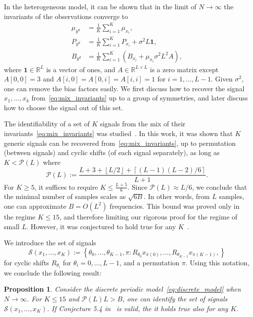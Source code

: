 \documentclass[english,12pt]{article}
\newcommand{\TODO}[1]{{\color{red}{[#1]}}}
\numberwithin{equation}{section}
\numberwithin{thm}{section} %
\newtheorem{prop}[thm]{Proposition}
\begin{document}
In the heterogeneous model, it can be shown that in the limit of $N\to\infty$ the invariants of the observations converge to \TODO{should be written more accurately} 
\begin{align} \label{eq:mix_invariants}
\mu_{y^d} &= \frac{1}{K}\sum_{i=1}^K \mu_{x_i}, \nonumber\\
P_{y^d} &= \frac{1}{K}\sum_{i=1}^K P_{x_i} + \sigma^2L\mathbf{1}, \\
B_{y^d} &= \frac{1}{K}\sum_{i=1}^K (B_{x_i} +\mu_{x_i}\sigma^2L^2 A ), \nonumber
\end{align}
where $\mathbf{1}\in\mathbb{R}^L$ is a vector of ones, and $A\in\mathbb{R}^{L\times L}$ is a zero matrix except $A[0,0]=3$ and $A[i,0]=A[0,i]=A[i,i]=1$ for $i=1,\ldots,L-1$.
Given $\sigma^2$, one can remove the bias factors easily. 
We first discuss how to recover the signal $x_1,\ldots,x_k$ from~\eqref{eq:mix_invariants} up to a group of symmetries, and later discuss how to  choose the signal out of this set. 

The identifiability of a set of $K$ signals from the mix of their  invariants~\eqref{eq:mix_invariants} was studied~\cite{bandeira2017estimation}. In this work, it was shown that $K$ generic signals can be recovered from~\eqref{eq:mix_invariants}, up to permutation (between signals) and cyclic shifts (of each signal separately), as long as $K<\mathcal{P}(L)$ where
\begin{equation} \label{eq:Pl}
\mathcal{P}(L) := \frac{L+3+\left\lfloor L/2\right\rfloor +  \left\lceil (L-1)(L-2)/6\right\rceil}{L+1}.
\end{equation}
For $K\geq 5$, it suffices to require $K\leq \frac{L+5}{6}$. 
Since $\mathcal{P}(L) \approx L/6$, we conclude that the minimal number of samples scales as $\sqrt{6B}$. In other words, from $L$ samples, one can approximate  $B=O(L^2)$ frequencies. 
This bound was proved only in the regime $K\leq 15$, and therefore limiting our rigorous proof for the regime of small $L$. 
However, it was conjectured  to hold true for any $K$~\cite[Conjecture 5.4]{bandeira2017estimation}. \TODO{To stress the difference between identify the signals, and recover them.}

We introduce the set of signals \TODO{to explain where this set comes from}
\begin{equation}
\mathcal{S}(x_1,\ldots,x_K):=\left\{ \theta_0,\ldots,\theta_{K-1},\pi : R_{\theta_0}x_{\pi(0)}, \ldots,R_{\theta_{K-1}}x_{\pi(K-1)},
 \right\}
\end{equation}
for cyclic shifts $R_{\theta_i}$ for $\theta_i=0,\ldots,L-1$, and a permutation $\pi$. Using this notation, we conclude the following result:
\begin{prop} \label{prop1}
Consider the  discrete periodic model~\eqref{eq:discrete_model} when $N\to\infty$. 
For $K\leq 15$ and  $\mathcal{P}(L)L>B$, one can identify the set of signals $\mathcal{S}(x_1,\ldots,x_K)$.
If Conjecture 5.4 in~\cite{bandeira2017estimation} is valid, the it holds true also for any $K$.
\end{prop}	
\end{document}
